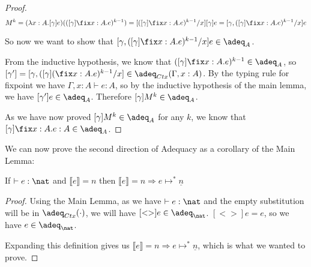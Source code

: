\begin{proof}
\[ M^k = (\lambda x : A. [\gamma]e)(([\gamma] \fix x:A. e)^{k - 1})  = [([\gamma] \fix x:A. e)^{k - 1}/x][\gamma]e = [\gamma,([\gamma] \fix x:A. e)^{k - 1}/x] e \]

So now we want to show that $[\gamma,([\gamma] \fix x:A. e)^{k - 1}/x] e \in \adeq_A$.

From the inductive hypothesis, we know that  $([\gamma] \fix x:A. e)^{k - 1} \in \adeq_A$, so $[\gamma'] = [\gamma,([\gamma] (\fix x:A. e)^{k - 1}/x] \in \adeq_{Ctx}(\Gamma, x : A)$. By the typing rule for fixpoint we have $\Gamma, x :A \vdash e : A$, so by the inductive hypothesis of the main lemma, we have $[\gamma']e \in \adeq_A$.  Therefore $[\gamma]M^k \in \adeq_A$.

As we have now proved $[\gamma]M^k \in \adeq_A$ for any $k$, we know that $[\gamma] \fix x:A. e:A \in \adeq_A$.


\end{proof}

We can now prove the second direction of Adequacy as a corollary of the Main Lemma:

\vspace{0.5cm}

\begin{cor}
If $\vdash e : \nat$ and $\llbracket e \rrbracket = n$ then $\llbracket e \rrbracket = n \Rightarrow e \mapsto^* \underline{n}$
\end{cor}

\begin{proof}
Using the Main Lemma, as we have $\vdash e : \nat$ and the empty substitution will be in $\adeq_{Ctx}(\cdot)$, we will have $[<>]e \in \adeq_{\nat}$. $[<>]e = e$, so we have $e \in \adeq_{\nat}$.

Expanding this definition gives us $\llbracket e \rrbracket = n \Rightarrow e \mapsto^* \underline{n}$, which is what we wanted to prove.
\end{proof}